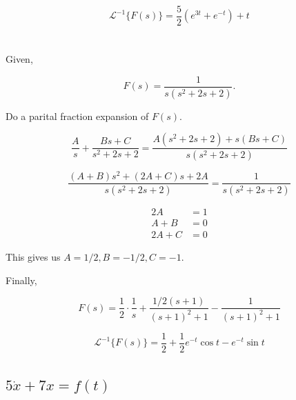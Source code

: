 \documentclass[12pt]{article}
\numberwithin{equation}{section}
\begin{document}
  \begin{equation}
    \mathcal{L}^{-1}\{F(s)\} = \frac{5}{2} \left( e^{3t} + e^{-t} \right) + t
  \end{equation}






  \newpage
  \section{}

  Given,

  \[
      F(s) = \frac{1}{s (s ^2 + 2s + 2)}
    .\]

  Do a parital fraction expansion of $ F(s). $

  \begin{equation}
    \frac{A}{s} + \frac{Bs + C}{s ^2 + 2s + 2} = \frac{A(s^2 + 2s +2) + s(Bs + C)}{s(s ^2 + 2s + 2)}
  \end{equation}

  \begin{equation}
    \frac{(A + B)s ^2 + (2A + C)s + 2A}{s(s^2 + 2s + 2)} = \frac{1}{s(s^2 + 2s + 2)}
  \end{equation}

  \begin{align*}
    2A &= 1 \\
    A + B &= 0 \\
    2A + C &= 0
  \end{align*}

  This gives us $ A = 1/2, B = -1/2, C = -1. $

  Finally,

  \begin{equation}
    F(s) = \frac{1}{2} \cdot \frac{1}{s} + \frac{1/2 (s + 1)}{(s + 1)^2 + 1} - \frac{1}{(s + 1)^2 + 1}
  \end{equation}

  \begin{equation}
    \mathcal{L}^{-1}\{F(s)\} = \frac{1}{2} + \frac{1}{2} e^{-t}\cos t - e^{-t}\sin t
  \end{equation}

  \section{}

  \subsection{$ 5\dot x + 7x = f(t) $}
\end{document}
